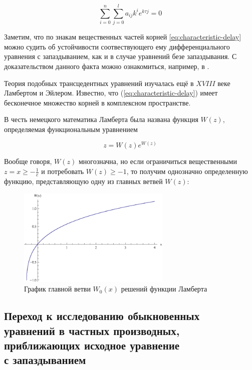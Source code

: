 \begin{equation}\label{eq:characteristic-delay}
\sum\limits_{i=0}^{n} \sum\limits_{j=0}^{l} a_{ij} k^i e^{k \tau j} = 0
\end{equation}

Заметим, что по знакам вещественных частей корней \ref{eq:characteristic-delay} можно судить об устойчивости соотвествующего ему дифференциального уравнения с запаздыванием, как и в случае уравнений безе запаздывания. С доказательством данного факта можно ознакомиться, например, в \cite{bib:Elsgoltz-Norkin}.

Теория подобных трансцедентных уравнений изучалась ещё в $XVIII$ веке Ламбертом и Эйлером. Известно, что (\ref{eq:characteristic-delay}) имеет бесконечное множество корней в комплексном пространстве.

В честь немецкого математика Ламберта была названа функция $W(z)$, определяемая функциональным уравнением

\begin{equation}
z = W(z) e^{W(z)}
\end{equation}

Вообще говоря, $W(z)$ многозначна, но если ограничиться вещественными $z = x \geq -\frac{1}{e}$ и потребовать $W(z) \geq -1$, то получим однозначно определенную функцию, представляющую одну из главных ветвей $W(z)$:

\begin{figure}[h]
\begin{center}
\includegraphics[width=0.65\textwidth]{./1_modelling/Lambert.eps}
\end{center}
\caption{График главной ветви $W_0(x)$ решений функции Ламберта}
\end{figure}

\subsection{Переход к исследованию обыкновенных\\уравнений в частных производных,\\приближающих исходное уравнение\\с запаздыванием}\label{sec:transition}

